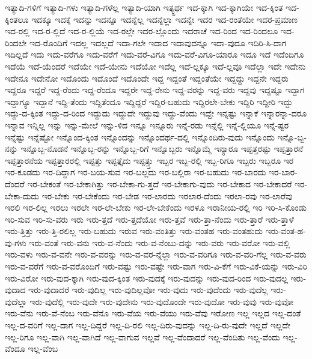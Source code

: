 {ಇತ್ಯಾದಿ-ಗಳಿಗೆ
ಇತ್ಯಾದಿ-ಗಳು
ಇತ್ಯಾದಿ-ಗಳೆಲ್ಲ
ಇತ್ಯಾದಿ-ಯಾಗಿ
ಇತ್ಯ್ಧರ್ಥ
ಇದ-ಕ್ಕಾಗಿ
ಇದ-ಕ್ಕಾಗಿಯೇ
ಇದ-ಕ್ಕಿಂತ
ಇದ-ಕ್ಕಿಂತಲೂ
ಇದಕ್ಕೂ
ಇದಕ್ಕೆ
ಇದನ್ನು
ಇದನ್ನೂ
ಇದನ್ನೆಲ್ಲ
ಇದನ್ನೆಲ್ಲಾ
ಇದನ್ನೇ
ಇದರ
ಇದ-ರಂತೆಯೇ
ಇದರ-ಪ್ರಮಾಣ
ಇದ-ರಲ್ಲಿ
ಇದ-ರ-ಲ್ಲಿದೆ
ಇದ-ರ-ಲ್ಲಿಯೆ
ಇದ-ರಲ್ಲೇ
ಇದರ-ಲ್ಲೊಂದು
ಇದರಾಚೆ
ಇದ-ರಿಂದ
ಇದ-ರಿಂದಲೂ
ಇದ-ರಿಂದಲೇ
ಇದ-ರೊಂದಿಗೆ
ಇದಲ್ಲ
ಇದಲ್ಲದೆ
ಇದಾ-ಗಲೇ
ಇದಾದ
ಇದಾವುದನ್ನೂ
ಇದಾ-ವುದೂ
ಇದಿರಿ-ಸಿ-ದಾಗ
ಇದಿಲ್ಲದೆ
ಇದು
ಇದು-ವರೆಗೂ
ಇದು-ವರೆಗೆ
ಇದು-ವರೆ-ವಿಗೂ
ಇದು-ವರೆ-ವಿಗೂ-ಯಾರೂ
ಇದೂ
ಇದೆ
ಇದೆಂದಿಗೂ
ಇದೆಯೆ
ಇದೆ-ಯೆಂದರೆ
ಇದೆಯೇ
ಇದೆ-ಯೇನು
ಇದೆಯೋ
ಇದೆಲ್ಲ
ಇದೆ-ಲ್ಲಕ್ಕೂ
ಇದೆ-ಲ್ಲವೂ
ಇದೆಲ್ಲಾ
ಇದೇ
ಇದೇನು
ಇದೇನೂ
ಇದೇನೋ
ಇದೊಂದು
ಇದೊಂದೆ
ಇದೊಂದೇ
ಇದ್ದ
ಇದ್ದಂತೆ
ಇದ್ದಂತೆಯೇ
ಇದ್ದದ್ದು
ಇದ್ದನೇ
ಇದ್ದರು
ಇದ್ದರೂ
ಇದ್ದರೆ
ಇದ್ದ-ರೆಂದು
ಇದ್ದ-ರೆಂದೂ
ಇದ್ದರೇ
ಇದ್ದ-ರೇನು
ಇದ್ದ-ವರನ್ನು
ಇದ್ದ-ವರು
ಇದ್ದವು
ಇದ್ದಷ್ಟೂ
ಇದ್ದಾಗ
ಇದ್ದಾಗ್ಯೂ
ಇದ್ದಾನೆ
ಇದ್ದಿ-ತೆಂದು
ಇದ್ದಿತೆಂದೂ
ಇದ್ದಿದ್ದರೆ
ಇದ್ದಿರ-ಬಹುದು
ಇದ್ದಿರಲೇ-ಬೇಕು
ಇದ್ದಿರಿ
ಇದ್ದೀರಿ
ಇದ್ದು
ಇದ್ದು-ದ-ಕ್ಕಿಂತ
ಇದ್ದು-ದ-ರಿಂದ
ಇದ್ದುದು
ಇದ್ದುದೇ
ಇದ್ದುವು
ಇದ್ದು-ವೆಂದು
ಇದ್ದೇ
ಇನ್ನಷ್ಟು
ಇನ್ನಾಕೆ
ಇನ್ನಾರನ್ನಾ-ದರೂ
ಇನ್ನಾವ
ಇನ್ನಿಲ್ಲ
ಇನ್ನು
ಇನ್ನು-ಮೇಲೆ
ಇನ್ನು-ಳಿದ
ಇನ್ನೂ
ಇನ್ನೂರು
ಇನ್ನೆ-ರಡು
ಇನ್ನೆಲ್ಲಿ
ಇನ್ನೆ-ಲ್ಲಿಯೂ
ಇನ್ನೆ-ಷ್ಟರ
ಇನ್ನೆಷ್ಟು
ಇನ್ನೆಷ್ಟೋ
ಇನ್ನೊಂದ-ಕ್ಕಿಂತ
ಇನ್ನೊಂದನ್ನು
ಇನ್ನೊಂದರ್ಥ-ದಲ್ಲಿ
ಇನ್ನೊಂದಿರು-ವುದು
ಇನ್ನೊಂದು
ಇನ್ನೊ-ಬ್ಬ-ನನ್ನು
ಇನ್ನೊಬ್ಬ-ನೊಡನೆ
ಇನ್ನೊಬ್ಬ-ರನ್ನು
ಇನ್ನೊಬ್ಬ-ರಿಗೆ
ಇನ್ನೊಬ್ಬರು
ಇನ್ನೊಮ್ಮೆ
ಇನ್ಯಾರೂ
ಇಪ್ಪತ್ತರಷ್ಟು
ಇಪ್ಪತ್ತಾರನೆ
ಇಪ್ಪತ್ತಾರನೆಯ
ಇಪ್ಪತ್ತಾರರಲ್ಲಿ
ಇಪ್ಪತ್ತು
ಇಪ್ಪತ್ತೈದು
ಇಪ್ಪತ್ತ್ತು
ಇಬ್ಬರ
ಇಬ್ಬ-ರಲ್ಲಿ
ಇಬ್ಬ-ರಿಗೂ
ಇಬ್ಬರು
ಇಬ್ಬರೂ
ಇರ
ಇರ-ಕೂಡದು
ಇರ-ದಿದ್ದಾಗ
ಇರ-ಬಯ-ಸುವ
ಇರ-ಬಲ್ಲದು
ಇರ-ಬಲ್ಲಿರಾ
ಇರ-ಬಹುದು
ಇರ-ಬಾರದು
ಇರ-ಬಾರ-ದೆಂದರೆ
ಇರ-ಬೇಕಂತೆ
ಇರ-ಬೇಕಾಗಿತ್ತು
ಇರ-ಬೇಕಾ-ಗು-ತ್ತದೆ
ಇರ-ಬೇಕಾಗು-ವುದು
ಇರ-ಬೇಕಾದ
ಇರ-ಬೇಕಾದರೆ
ಇರ-ಬೇಕಾ-ದುದು
ಇರ-ಬೇಕು
ಇರ-ಬೇಕೆಂದು
ಇರ-ಬೇಡ
ಇರ-ಲಾರದು
ಇರಲಾರ-ದೆಂದು
ಇರಲಾ-ರವು
ಇರ-ಲಾರೆವು
ಇರಲಿ
ಇರ-ಲಿಲ್ಲ
ಇರಲು
ಇರಲೇ
ಇರ-ಲೇ-ಬೇಕು
ಇರ-ಲೇ-ಬೇಕೆಂದು
ಇರಳೂ
ಇರಾನೀಯ-ರಲ್ಲಿ
ಇರಿ
ಇರಿ-ಸಿ-ಕೊಂಡು
ಇರಿ-ಸುವ
ಇರಿ-ಸು-ವರು
ಇರು
ಇರು-ತ್ತದೆ
ಇರು-ತ್ತದೆಯೋ
ಇರು-ತ್ತವೆ
ಇರು-ತ್ತಾ-ನೆಂದು
ಇರು-ತ್ತಾರೆ
ಇರು-ತ್ತಾಳೆ
ಇರು-ತ್ತಿತ್ತು
ಇರು-ತ್ತಿ-ರಲಿಲ್ಲ
ಇರು-ಬಹುದು
ಇರುವ
ಇರು-ವಂತಿತ್ತು
ಇರು-ವಂತಹ
ಇರು-ವಂತಹುದು
ಇರು-ವಂತ-ಹ-ವು-ಗಳು
ಇರು-ವಂತೆ
ಇರು-ವನು
ಇರು-ವ-ನೆಂದು
ಇರು-ವ-ನೆಂಬು-ದನ್ನು
ಇರು-ವರು
ಇರು-ವರೋ
ಇರು-ವಲ್ಲಿ
ಇರು-ವಳು
ಇರು-ವ-ವನೇ
ಇರು-ವ-ವರನ್ನು
ಇರು-ವ-ವರ-ನ್ನೆಲ್ಲಾ
ಇರು-ವ-ವರಿಗೂ
ಇರು-ವ-ವರಿ-ಗೆಲ್ಲ
ಇರು-ವ-ವರು
ಇರು-ವ-ವರೆಗೆ
ಇರು-ವ-ವರೊಂದಿಗೆ
ಇರು-ವಷ್ಟು
ಇರು-ವಷ್ಟೇ
ಇರು-ವಾಗ
ಇರು-ವಿ-ಕೆಗೆ
ಇರು-ವಿಕೆ-ಯನ್ನು
ಇರು-ವಿರಿ
ಇರು-ವಿರೋ
ಇರು-ವುದ-ಕ್ಕಾಗಿ
ಇರು-ವುದ-ಕ್ಕಿಂತ
ಇರು-ವುದಕ್ಕೆ
ಇರು-ವುದನ್ನು
ಇರು-ವುದ-ರಿಂದ
ಇರು-ವುದಲ್ಲ
ಇರು-ವುದಾದ
ಇರು-ವುದಾದರೆ
ಇರು-ವುದಿಲ್ಲ
ಇರು-ವುದಿಲ್ಲವೋ
ಇರು-ವುದು
ಇರು-ವುದೆಂದು
ಇರು-ವುದೆಲ್ಲ
ಇರು-ವುದೆಲ್ಲಾ
ಇರು-ವುದೆಲ್ಲಿ
ಇರು-ವುದೇ
ಇರು-ವುದೇನು
ಇರು-ವುದೊಂದೇ
ಇರು-ವುದೋ
ಇರು-ವುವು
ಇರು-ವುವೋ
ಇರು-ವೆನು
ಇರು-ವೆ-ನೆಂಬ
ಇರು-ವೆನೊ
ಇರು-ವೆಯ
ಇರು-ವೆಯು
ಇರು-ವೆವು
ಇರೋಣ
ಇಲ್ಲ
ಇಲ್ಲದ
ಇಲ್ಲ-ದಂತೆ
ಇಲ್ಲ-ದ-ವರಿಗೆ
ಇಲ್ಲ-ದಾಗ
ಇಲ್ಲ-ದಿದ್ದರೆ
ಇಲ್ಲ-ದಿ-ರಲಿ
ಇಲ್ಲ-ದಿರು-ವುದನ್ನು
ಇಲ್ಲ-ದಿ-ರು-ವುದೇ
ಇಲ್ಲದೆ
ಇಲ್ಲದೇ
ಇಲ್ಲ-ರಿಗೂ
ಇಲ್ಲ-ವಾಗಿ
ಇಲ್ಲ-ವಾಗಿದೆ
ಇಲ್ಲ-ವಾಗುವ
ಇಲ್ಲವೆ
ಇಲ್ಲ-ವೆಂದಾದರೆ
ಇಲ್ಲ-ವೆಂದಿತು
ಇಲ್ಲ-ವೆಂದು
ಇಲ್ಲ-ವೆಂದೂ
ಇಲ್ಲ-ವೆಂಬ
}
